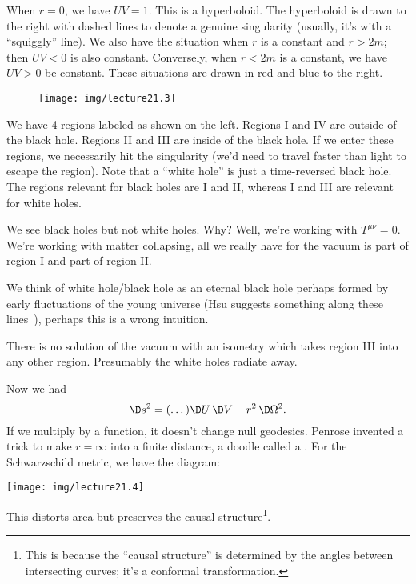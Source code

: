 When $r=0$, we have $UV=1$. This is a hyperboloid. The
hyperboloid is drawn to the right with dashed lines to denote a
genuine singularity (usually, it's with a ``squiggly'' line).
We also have the situation when $r$ is a constant and $r>2m$;
then $UV<0$ is also constant. Conversely, when $r<2m$ is a
constant, we have $UV>0$ be constant. These situations are drawn
in red and blue to the right.


\begin{wrapfigure}{l}{11pc}
\vspace{-1pc}
\texttt{[image: img/lecture21.3]}
\vspace{-1pc}
\end{wrapfigure}
We have 4 regions labeled as shown on the left. Regions I and IV
are outside of the black hole. Regions II and III are inside of
the black hole. If we enter these regions, we necessarily hit the
singularity (we'd need to travel faster than light to escape the
region). Note that a ``white hole'' is just a time-reversed black
hole. The regions relevant for black holes are I and II, whereas
I and III are relevant for white holes.

We see black holes but not white holes. Why? Well, we're working
with $T^{\mu\nu}=0$. We're working with matter collapsing, all we
really have for the vacuum is part of region I and part of region II.

We think of white hole/black hole as an eternal black hole
perhaps formed by early fluctuations of the young universe (Hsu
suggests something along these lines~\cite{Hsu:2010vp}), perhaps
this is a wrong intuition. 

There is no solution of the vacuum with an isometry which takes
region III into any other region. Presumably the white holes
radiate away.

Now we had
\begin{equation}
\D s^{2} = (\dots)\D U\,\D V - r^{2}\,\D\Omega^{2}.
\end{equation}
If we multiply by a function, it doesn't change null
geodesics. Penrose invented a trick to make $r=\infty$ into a
finite distance, a doodle called a . For
the Schwarzschild metric, we have the diagram:
\begin{center}
\texttt{[image: img/lecture21.4]}
\end{center}
This distorts area but preserves the causal
structure\footnote{This is because the ``causal structure'' is
  determined by the angles between intersecting curves; it's a
  conformal transformation.}. 

